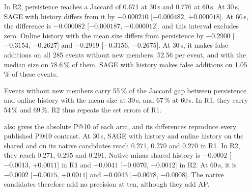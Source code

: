 In R2, persistence reaches a Jaccard of 0.671 at 30\,s and 0.776 at 60\,s.
At 30\,s, SAGE with history differs from it by $-0.000210$ [$-0.000482$, $+0.000018$].
At 60\,s, the difference is $-0.000082$ [$-0.000187$, $-0.000012$], and this interval excludes zero.
Online history with the mean size differs from persistence by $-0.2900$ [$-0.3154$, $-0.2627$] and $-0.2919$ [$-0.3156$, $-0.2675$].
At 30\,s, it makes false additions on all 285 events without new members, 52.56 per event, and with the median size on 78.6\,\% of them.
SAGE with history makes false additions on 1.05\,\% of these events.

Events without new members carry 55\,\% of the Jaccard gap between persistence and online history with the mean size at 30\,s, and 67\,\% at 60\,s.
In R1, they carry 54\,\% and 69\,\%.
R2 thus repeats the set errors of R1.

 also gives the absolute P@10 of each arm, and its differences reproduce every published P@10 contrast.
At 30\,s, SAGE with history and online history on the shared and on its native candidates reach 0.271, 0.270 and 0.270 in R1.
In R2, they reach 0.271, 0.295 and 0.291.
Native minus shared history is $-0.0002$ [$-0.0013$, $+0.0011$] in R1 and $-0.0041$ [$-0.0070$, $-0.0012$] in R2.
At 60\,s, it is $-0.0002$ [$-0.0015$, $+0.0011$] and $-0.0043$ [$-0.0078$, $-0.0008$].
The native candidates therefore add no precision at ten, although they add AP.

